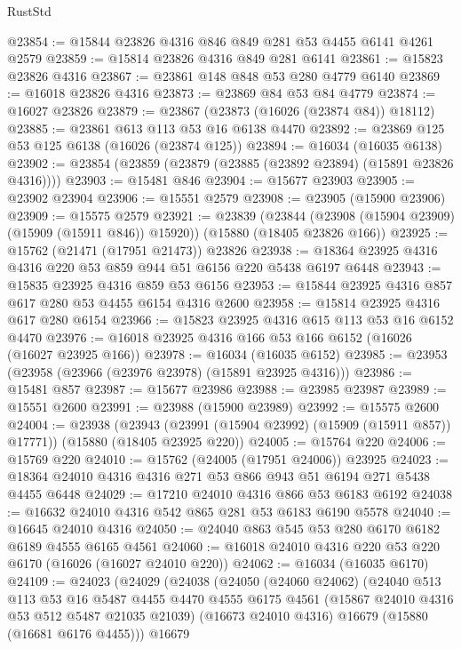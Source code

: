 \begin{lexlean}{RustStd}
\begin{coremodule}
@23854 := @15844 @23826 @4316 @846 @849 @281 @53 @4455 @6141 @4261 @2579
@23859 := @15814 @23826 @4316 @849 @281 @6141
@23861 := @15823 @23826 @4316
@23867 := @23861 @148 @848 @53 @280 @4779 @6140
@23869 := @16018 @23826 @4316
@23873 := @23869 @84 @53 @84 @4779
@23874 := @16027 @23826
@23879 := @23867 (@23873 (@16026 (@23874 @84)) @18112)
@23885 := @23861 @613 @113 @53 @16 @6138 @4470
@23892 := @23869 @125 @53 @125 @6138 (@16026 (@23874 @125))
@23894 := @16034 (@16035 @6138)
@23902 := @23854 (@23859 (@23879 (@23885 (@23892 @23894) (@15891 @23826 @4316))))
@23903 := @15481 @846
@23904 := @15677 @23903
@23905 := @23902 @23904
@23906 := @15551 @2579
@23908 := @23905 (@15900 @23906)
@23909 := @15575 @2579
@23921 := @23839
    (@23844 (@23908 (@15904 @23909) (@15909 (@15911 @846)) @15920))
    (@15880 (@18405 @23826 @166))
@23925 := @15762 (@21471 (@17951 @21473)) @23826
@23938 := @18364 @23925 @4316 @4316 @220 @53 @859 @944 @51 @6156 @220 @5438 @6197 @6448
@23943 := @15835 @23925 @4316 @859 @53 @6156
@23953 := @15844 @23925 @4316 @857 @617 @280 @53 @4455 @6154 @4316 @2600
@23958 := @15814 @23925 @4316 @617 @280 @6154
@23966 := @15823 @23925 @4316 @615 @113 @53 @16 @6152 @4470
@23976 := @16018 @23925 @4316 @166 @53 @166 @6152 (@16026 (@16027 @23925 @166))
@23978 := @16034 (@16035 @6152)
@23985 := @23953 (@23958 (@23966 (@23976 @23978) (@15891 @23925 @4316)))
@23986 := @15481 @857
@23987 := @15677 @23986
@23988 := @23985 @23987
@23989 := @15551 @2600
@23991 := @23988 (@15900 @23989)
@23992 := @15575 @2600
@24004 := @23938
    (@23943 (@23991 (@15904 @23992) (@15909 (@15911 @857)) @17771))
    (@15880 (@18405 @23925 @220))
@24005 := @15764 @220
@24006 := @15769 @220
@24010 := @15762 (@24005 (@17951 @24006)) @23925
@24023 := @18364 @24010 @4316 @4316 @271 @53 @866 @943 @51 @6194 @271 @5438 @4455 @6448
@24029 := @17210 @24010 @4316 @866 @53 @6183 @6192
@24038 := @16632 @24010 @4316 @542 @865 @281 @53 @6183 @6190 @5578
@24040 := @16645 @24010 @4316
@24050 := @24040 @863 @545 @53 @280 @6170 @6182 @6189 @4555 @6165 @4561
@24060 := @16018 @24010 @4316 @220 @53 @220 @6170 (@16026 (@16027 @24010 @220))
@24062 := @16034 (@16035 @6170)
@24109 := @24023
    (@24029
      (@24038
        (@24050
          (@24060 @24062)
          (@24040
            @513
            @113
            @53
            @16
            @5487
            @4455
            @4470
            @4555
            @6175
            @4561
            (@15867 @24010 @4316 @53 @512 @5487 @21035 @21039)
            (@16673 @24010 @4316)
            @16679
            (@15880 (@16681 @6176 @4455)))
          @16679

\end{coremodule}
\end{lexlean}
